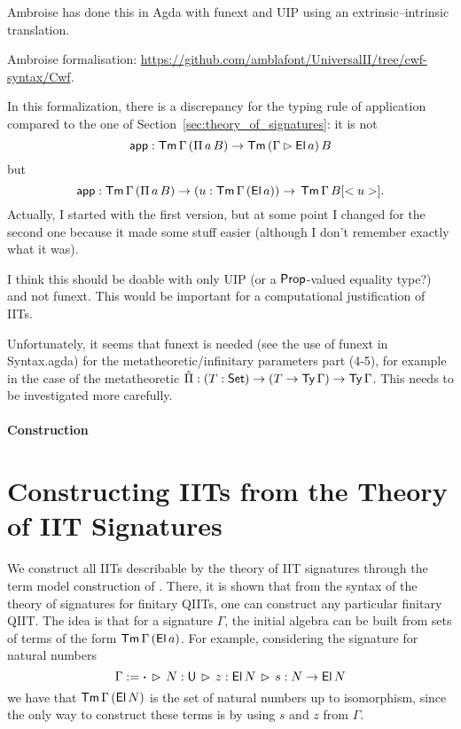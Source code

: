 \documentclass[a4paper,UKenglish,cleveref, autoref]{lipics-v2019}
\begin{document}
Ambroise has done this in Agda with funext and UIP using an
extrinsic--intrinsic translation.

Ambroise formalisation: \url{https://github.com/amblafont/UniversalII/tree/cwf-syntax/Cwf}.

In this formalization, there is a discrepancy for the typing rule of application
compared to the one of Section~\ref{sec:theory_of_signatures}: it is not
\[
   \mathsf{app}  : \mathsf{Tm}\,\Gamma\,(\Pi\,a\,B)\rightarrow\mathsf{Tm}\,(\Gamma\rhd \mathsf{El}\,a)\,B
\]
but
\[
   \mathsf{app}  : \mathsf{Tm}\,\Gamma\,(\Pi\,a\,B)\rightarrow(u : \mathsf{Tm}\,\Gamma\,(\mathsf{El}\,a))\rightarrow\,\mathsf{Tm}\,\Gamma\,B[<u>].
\]
Actually, I started with the first version, but at some point I
changed for the second one because it made some stuff easier (although
I don't remember exactly what it was).

I think this should be doable with only UIP (or a $\mathsf{Prop}$-valued
equality type?) and not funext. This would be important for a
computational justification of IITs.

Unfortunately, it seems that funext is needed (see the use of funext in
Syntax.agda) for the metatheoretic/infinitary
parameters part (4-5), for example in the case of the metatheoretic
$ \hat{\Pi}  : (T:\mathsf{Set})\rightarrow(T\rightarrow\mathsf{Ty}\,\Gamma)\rightarrow\mathsf{Ty}\,\Gamma $. This needs to be
investigated more carefully.

\paragraph*{Construction}


\section{Constructing IITs from the Theory of IIT Signatures}
\label{sec:constructingiits}

We construct all IITs describable by the theory of IIT signatures through the
term model construction of \cite{Kaposi:2019:CQI:3302515.3290315}. There, it is
shown that from the syntax of the theory of signatures for finitary QIITs, one
can construct any particular finitary QIIT. The idea is that for a signature
$\Gamma$, the initial algebra can be built from sets of terms of the form
$\mathsf{Tm}\,\Gamma\,(\mathsf{El}\,a)$. For example, considering the signature for natural
numbers
\[
  \Gamma := \boldsymbol{\cdot}\,\rhd\,N:\mathsf{U}\,\rhd\,z : \mathsf{El}\,N\,\rhd\,s : N \rightarrow \mathsf{El}\,N
\]
we have that $\mathsf{Tm}\,\Gamma\,(\mathsf{El}\,N)$ is the set of natural numbers up to isomorphism,
since the only way to construct these terms is by using $s$ and $z$ from $\Gamma$.
\end{document}
